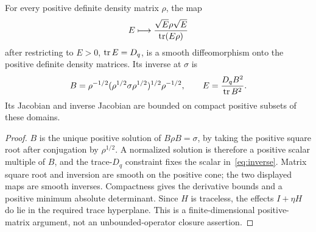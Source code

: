 \begin{lemma}\label{lem:congruence}
For every positive definite density matrix $\rho$, the map
\[
 E\longmapsto\frac{\sqrt E\rho\sqrt E}{\operatorname{tr}(E\rho)}
\]
after restricting to $E>0$, $\operatorname{tr} E=D_q$, is a smooth diffeomorphism onto the positive definite density matrices. Its inverse at $\sigma$ is
\begin{equation}\label{eq:inverse}
 B=\rho^{-1/2}(\rho^{1/2}\sigma\rho^{1/2})^{1/2}\rho^{-1/2},
 \qquad E=\frac{D_q B^2}{\operatorname{tr} B^2}.
\end{equation}
Its Jacobian and inverse Jacobian are bounded on compact positive subsets of these domains.
\end{lemma}
\begin{proof}
$B$ is the unique positive solution of $B\rho B=\sigma$, by taking the positive square root after conjugation by $\rho^{1/2}$. A normalized solution is therefore a positive scalar multiple of $B$, and the trace-$D_q$ constraint fixes the scalar in~\eqref{eq:inverse}. Matrix square root and inversion are smooth on the positive cone; the two displayed maps are smooth inverses. Compactness gives the derivative bounds and a positive minimum absolute determinant. Since $H$ is traceless, the effects $I+\eta H$ do lie in the required trace hyperplane. This is a finite-dimensional positive-matrix argument, not an unbounded-operator closure assertion.
\end{proof}

